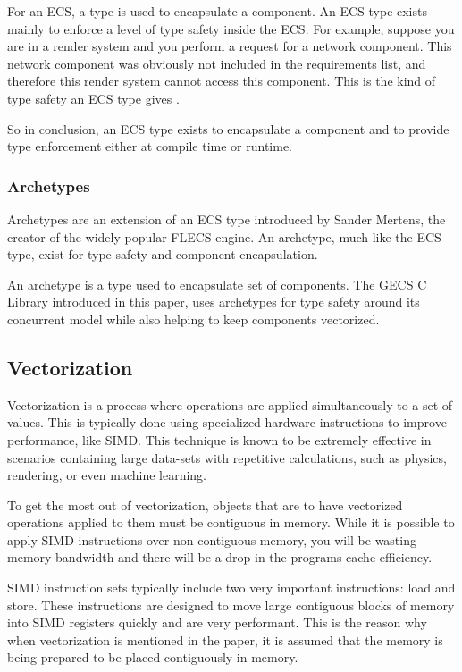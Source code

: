 For an ECS, a type is used to encapsulate a component. An ECS type exists mainly to enforce a level of type safety inside the ECS. For example, suppose you are in a render system and you perform a request for a network component. This network component was obviously not included in the requirements list, and therefore this render system cannot access this component. This is the kind of type safety an ECS type gives \cite{SanderMertensECS}.

So in conclusion, an ECS type exists to encapsulate a component and to provide type enforcement either at compile time or runtime.

\subsubsection{Archetypes}
Archetypes are an extension of an ECS type introduced by Sander Mertens, the creator of the widely popular FLECS engine. An archetype, much like the ECS type, exist for type safety and component encapsulation. 

An archetype is a type used to encapsulate set of components. The GECS C Library introduced in this paper, uses archetypes for type safety around its concurrent model while also helping to keep components vectorized.

\subsection{Vectorization}
Vectorization is a process where operations are applied simultaneously to a set of values. This is typically done using specialized hardware instructions to improve performance, like SIMD. This technique is known to be extremely effective in scenarios containing large data-sets with repetitive calculations, such as physics, rendering, or even machine learning.  \cite{RomeoPHD}

To get the most out of vectorization, objects that are to have vectorized operations applied to them must be contiguous in memory. While it is possible to apply SIMD instructions over non-contiguous memory, you will be wasting memory bandwidth and there will be a drop in the programs cache efficiency. 

SIMD instruction sets typically include two very important instructions: load and store. These instructions are designed to move large contiguous blocks of memory into SIMD registers quickly and are very performant. This is the reason why when vectorization is mentioned in the paper, it is assumed that the memory is being prepared to be placed contiguously in memory. 

